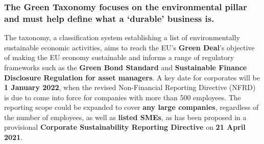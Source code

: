 \documentclass[12pt]{report}
\begin{document}
\subsubsection{ The Green Taxonomy focuses on the environmental pillar and must help define what a ‘durable’ business is. }

The taxonomy, a classification system establishing a list of environmentally sustainable economic activities, aims to reach the EU’s \textbf{Green Deal}’s objective of making the EU economy sustainable and informs a range of regulatory frameworks such as the \textbf{Green Bond Standard} and \textbf{Sustainable Finance Disclosure Regulation for asset managers}. A key date for corporates will be \textbf{1 January 2022}, when the revised Non-Financial Reporting Directive (NFRD) is due to come into force for companies with more than 500 employees. The reporting scope could be expanded to cover \textbf{any large companies}, regardless of the number of employees, as well as \textbf{listed SMEs}, as has been proposed in a provisional \textbf{Corporate Sustainability Reporting Directive} on \textbf{21 April 2021}.
\end{document}
